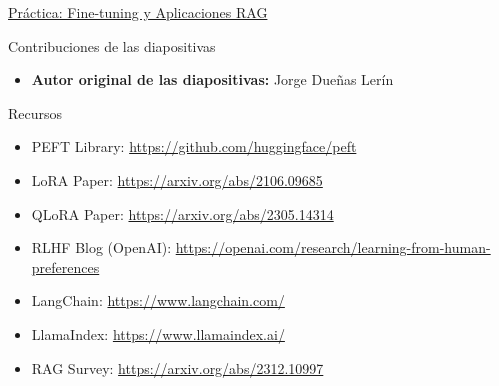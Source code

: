 \begin{exercise}
\href{https://colab.research.google.com/}{Práctica: Fine-tuning y Aplicaciones RAG}

\end{exercise}

\begin{frame}{Contribuciones de las diapositivas}
\begin{itemize}
    \item \textbf{Autor original de las diapositivas:} Jorge Dueñas Lerín
\end{itemize}
\end{frame}


\begin{frame}{Recursos}
\begin{itemize}
    \item PEFT Library: \url{https://github.com/huggingface/peft}
    \item LoRA Paper: \url{https://arxiv.org/abs/2106.09685}
    \item QLoRA Paper: \url{https://arxiv.org/abs/2305.14314}
    \item RLHF Blog (OpenAI): \url{https://openai.com/research/learning-from-human-preferences}
    \item LangChain: \url{https://www.langchain.com/}
    \item LlamaIndex: \url{https://www.llamaindex.ai/}
    \item RAG Survey: \url{https://arxiv.org/abs/2312.10997}
\end{itemize}
\end{frame}


